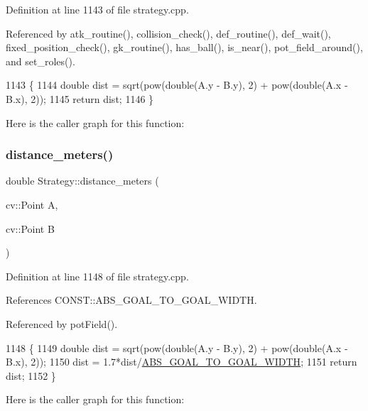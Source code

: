 Definition at line 1143 of file strategy.\+cpp.



Referenced by atk\+\_\+routine(), collision\+\_\+check(), def\+\_\+routine(), def\+\_\+wait(), fixed\+\_\+position\+\_\+check(), gk\+\_\+routine(), has\+\_\+ball(), is\+\_\+near(), pot\+\_\+field\+\_\+around(), and set\+\_\+roles().


\begin{DoxyCode}
1143                                               \{
1144     \textcolor{keywordtype}{double} dist = sqrt(pow(\textcolor{keywordtype}{double}(A.y - B.y), 2) + pow(\textcolor{keywordtype}{double}(A.x - B.x), 2));
1145     \textcolor{keywordflow}{return} dist;
1146 \}
\end{DoxyCode}
Here is the caller graph for this function\+:
\mbox{\label{class_strategy_a4052503aaa94bdbc1fca9f552ef96dbb}} 
\subsubsection{\texorpdfstring{distance\+\_\+meters()}{distance\_meters()}}
{\footnotesize\ttfamily double Strategy\+::distance\+\_\+meters (\begin{DoxyParamCaption}\item[{cv\+::\+Point}]{A,  }\item[{cv\+::\+Point}]{B }\end{DoxyParamCaption})\hspace{0.3cm}{\ttfamily [private]}}



Definition at line 1148 of file strategy.\+cpp.



References C\+O\+N\+S\+T\+::\+A\+B\+S\+\_\+\+G\+O\+A\+L\+\_\+\+T\+O\+\_\+\+G\+O\+A\+L\+\_\+\+W\+I\+D\+TH.



Referenced by pot\+Field().


\begin{DoxyCode}
1148                                                      \{
1149     \textcolor{keywordtype}{double} dist = sqrt(pow(\textcolor{keywordtype}{double}(A.y - B.y), 2) + pow(\textcolor{keywordtype}{double}(A.x - B.x), 2));
1150     dist = 1.7*dist/\hyperlink{namespace_c_o_n_s_t_abe3ca2e589a94f9e273309abaa8313d4}{ABS\_GOAL\_TO\_GOAL\_WIDTH};
1151     \textcolor{keywordflow}{return} dist;
1152 \}
\end{DoxyCode}
Here is the caller graph for this function\+:
\mbox{\label{class_strategy_aabfdf0c3cd206c94e8b37f86bb387a61}} 
